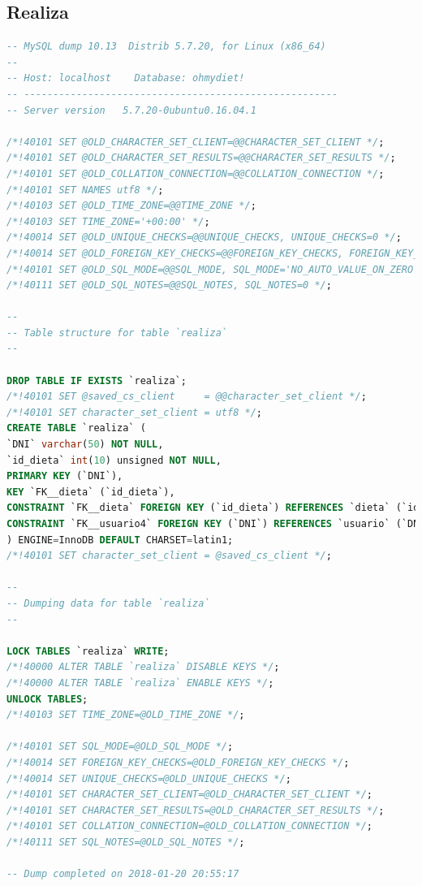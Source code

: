 \documentclass[12pt,letterpaper]{article}
\begin{document}
\subsection{Realiza}
\begin{lstlisting}[language=sql]
-- MySQL dump 10.13  Distrib 5.7.20, for Linux (x86_64)
--
-- Host: localhost    Database: ohmydiet!
-- ------------------------------------------------------
-- Server version	5.7.20-0ubuntu0.16.04.1

/*!40101 SET @OLD_CHARACTER_SET_CLIENT=@@CHARACTER_SET_CLIENT */;
/*!40101 SET @OLD_CHARACTER_SET_RESULTS=@@CHARACTER_SET_RESULTS */;
/*!40101 SET @OLD_COLLATION_CONNECTION=@@COLLATION_CONNECTION */;
/*!40101 SET NAMES utf8 */;
/*!40103 SET @OLD_TIME_ZONE=@@TIME_ZONE */;
/*!40103 SET TIME_ZONE='+00:00' */;
/*!40014 SET @OLD_UNIQUE_CHECKS=@@UNIQUE_CHECKS, UNIQUE_CHECKS=0 */;
/*!40014 SET @OLD_FOREIGN_KEY_CHECKS=@@FOREIGN_KEY_CHECKS, FOREIGN_KEY_CHECKS=0 */;
/*!40101 SET @OLD_SQL_MODE=@@SQL_MODE, SQL_MODE='NO_AUTO_VALUE_ON_ZERO' */;
/*!40111 SET @OLD_SQL_NOTES=@@SQL_NOTES, SQL_NOTES=0 */;

--
-- Table structure for table `realiza`
--

DROP TABLE IF EXISTS `realiza`;
/*!40101 SET @saved_cs_client     = @@character_set_client */;
/*!40101 SET character_set_client = utf8 */;
CREATE TABLE `realiza` (
`DNI` varchar(50) NOT NULL,
`id_dieta` int(10) unsigned NOT NULL,
PRIMARY KEY (`DNI`),
KEY `FK__dieta` (`id_dieta`),
CONSTRAINT `FK__dieta` FOREIGN KEY (`id_dieta`) REFERENCES `dieta` (`id_dieta`),
CONSTRAINT `FK__usuario4` FOREIGN KEY (`DNI`) REFERENCES `usuario` (`DNI`)
) ENGINE=InnoDB DEFAULT CHARSET=latin1;
/*!40101 SET character_set_client = @saved_cs_client */;

--
-- Dumping data for table `realiza`
--

LOCK TABLES `realiza` WRITE;
/*!40000 ALTER TABLE `realiza` DISABLE KEYS */;
/*!40000 ALTER TABLE `realiza` ENABLE KEYS */;
UNLOCK TABLES;
/*!40103 SET TIME_ZONE=@OLD_TIME_ZONE */;

/*!40101 SET SQL_MODE=@OLD_SQL_MODE */;
/*!40014 SET FOREIGN_KEY_CHECKS=@OLD_FOREIGN_KEY_CHECKS */;
/*!40014 SET UNIQUE_CHECKS=@OLD_UNIQUE_CHECKS */;
/*!40101 SET CHARACTER_SET_CLIENT=@OLD_CHARACTER_SET_CLIENT */;
/*!40101 SET CHARACTER_SET_RESULTS=@OLD_CHARACTER_SET_RESULTS */;
/*!40101 SET COLLATION_CONNECTION=@OLD_COLLATION_CONNECTION */;
/*!40111 SET SQL_NOTES=@OLD_SQL_NOTES */;

-- Dump completed on 2018-01-20 20:55:17

\end{lstlisting}
\end{document}
